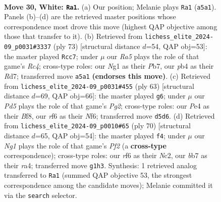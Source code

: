 \documentclass[11pt]{article}
\begin{document}
\clearpage

\begin{figure}[p]\centering
\begin{subfigure}{0.46\textwidth}\centering
\resizebox{\linewidth}{!}{%
\newchessgame
\chessboard[
  setfen={6k1/1b1n1p1p/5rp1/R2Pp3/1p2P3/1r3PP1/4K2P/6NR w - - 2 30},
  showmover=false,
  pgfstyle=straightmove, color=movearrow, markmove={a5-a1}
]}
\caption{}
\end{subfigure}\hfill
\begin{subfigure}{0.46\textwidth}\centering
\resizebox{\linewidth}{!}{%
\newchessgame
\chessboard[
  setfen={8/1p1r2p1/1k3p2/2r1pN1P/6R1/1P1n2P1/P3RPK1/8 b - - 8 37},
  showmover=false,
  pgfstyle=straightmove, color=movearrow, markmove={c5-c7}
]}
\caption{}
\end{subfigure}
\\[4pt]
\begin{subfigure}{0.46\textwidth}\centering
\resizebox{\linewidth}{!}{%
\newchessgame
\chessboard[
  setfen={3r1b2/6pk/1p1p1n1p/3PpN2/1PP5/B5RP/5PP1/6K1 b - - 0 32},
  showmover=false,
  pgfstyle=straightmove, color=movearrow, markmove={g7-g6}
]}
\caption{}
\end{subfigure}\hfill
\begin{subfigure}{0.46\textwidth}\centering
\resizebox{\linewidth}{!}{%
\newchessgame
\chessboard[
  setfen={8/8/2n1pk2/p1Pp3p/rp1P4/4K1P1/PRN2P2/8 w - - 0 36},
  showmover=false,
  pgfstyle=straightmove, color=movearrow, markmove={f2-f4}
]}
\caption{}
\end{subfigure}
\caption{\textbf{Move 30, White: \texttt{Ra1}.} (a) Our position; Melanie plays \texttt{Ra1} (\texttt{a5a1}). Panels (b)--(d) are the retrieved master positions whose correspondence most drove this move (highest QAP objective among those that transfer to it). (b) Retrieved from \texttt{lichess\_elite\_2024-09\_p0031\#3337} (ply 73) [structural distance $d$=54, QAP obj=53]: the master played \texttt{Rcc7}; under $\mu$ our \emph{Ra5} plays the role of that game's \emph{Rc4}; cross-type roles: our \emph{N}g1 as their \emph{P}b7, our \emph{p}b4 as their \emph{R}d7; transferred move \texttt{a5a1} \textbf{(endorses this move)}. (c) Retrieved from \texttt{lichess\_elite\_2024-09\_p0031\#455} (ply 63) [structural distance $d$=69, QAP obj=66]: the master played \texttt{g6}; under $\mu$ our \emph{Pd5} plays the role of that game's \emph{Pg2}; cross-type roles: our \emph{P}e4 as their \emph{B}f8, our \emph{r}f6 as their \emph{N}f6; transferred move \texttt{d5d6}. (d) Retrieved from \texttt{lichess\_elite\_2024-09\_p0010\#65} (ply 70) [structural distance $d$=65, QAP obj=54]: the master played \texttt{f4}; under $\mu$ our \emph{Ng1} plays the role of that game's \emph{Pf2} (a \textbf{cross-type} correspondence); cross-type roles: our \emph{r}f6 as their \emph{N}c2, our \emph{b}b7 as their \emph{r}a4; transferred move \texttt{g1h3}. Synthesis: 1 retrieved analog transferred to \texttt{Ra1} (summed QAP objective 53, the strongest correspondence among the candidate moves); Melanie committed it via the \texttt{search} selector.}
\label{fig:thought-m58}
\end{figure}
\end{document}
